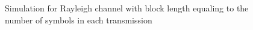 \begin{figure}[!htb]
	\setlength{}
	\setlength\fheight{0.4\textheight}
	\centering
		
	\caption{Simulation for Rayleigh channel with block length equaling to the number of symbols in each transmission}
	\label{fig:rayferthird}
\end{figure}



\clearpage
